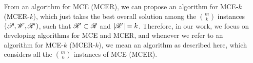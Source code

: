 From an algorithm for MCE (MCER), we can propose an algorithm for MCE-$k$ (MCER-$k$), which just takes the best overall solution among the $\binom{m}{k}$ instances $(\mathscr{P}, \mathscr{W}, \mathscr{R}')$, such that $\mathscr{R}' \subset \mathscr{R}$ and $|\mathscr{R}'| = k$. 
Therefore, in our work, we focus on developing algorithms for MCE and MCER, and whenever we refer to an algorithm for MCE-$k$ (MCER-$k$), we mean an algorithm as described here, which considers all the $\binom{m}{k}$ instances of MCE (MCER).


